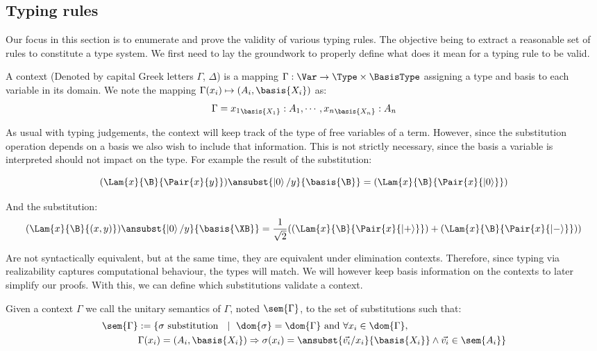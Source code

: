 \subsection{Typing rules}    
Our focus in this section is to enumerate and prove the validity of various typing rules. The objective being to extract a reasonable set of rules to constitute a type system. We first need to lay the groundwork to properly define what does it mean for a typing rule to be valid.

\begin{definition}
    A context (Denoted by capital Greek letters $\Gamma$, $\Delta$) is a mapping $\Gamma:\Var\to\Type\times\BasisType$ assigning a type and basis to each variable in its domain. We note the mapping $\Gamma(x_i)\mapsto(A_i, \basis{X_i})$ as:
    \[
    \Gamma = {x_1}_{\basis{X_1}}:A_1,\dotsb, {x_n}_{\basis{X_n}}:A_n
    \]
\end{definition}

As usual with typing judgements, the context will keep track of the type of free variables of a term. However, since the substitution operation depends on a basis we also wish to include that information. This is not strictly necessary, since the basis a variable is interpreted should not impact on the type. For example the result of the substitution:

\[
(\Lam{x}{\B}{\Pair{x}{y}})\ansubst{\ket{0}/y}{\basis{\B}} = (\Lam{x}{\B}{\Pair{x}{\ket{0}}})
\]

And the substitution:
\[
(\Lam{x}{\B}{(x, y)})\ansubst{\ket{0}/y}{\basis{\XB}} = \frac{1}{\sqrt{2}} ((\Lam{x}{\B}{\Pair{x}{\ket{+}}}) + (\Lam{x}{\B}{\Pair{x}{\ket{-}}}))
\]

Are not syntactically equivalent, but at the same time, they are equivalent under elimination contexts. Therefore, since typing via realizability captures computational behaviour, the types will match. We will however keep basis information on the contexts to later simplify our proofs. With this, we can define which substitutions validate a context.

\begin{definition}
    Given a context $\Gamma$ we call the unitary semantics of $\Gamma$, noted $\sem{\Gamma}$, to the set of substitutions such that:
    \begin{align*}
      \sem{\Gamma} &:= 
      \{\sigma\text{ substitution }~\mid~ \dom{\sigma} = \dom{\Gamma}\text{ and } \forall {x_i} \in\dom{\Gamma},\\
      &\Gamma(x_i) = (A_i, \basis{X_i})\Rightarrow \sigma(x_i)=\ansubst{\vec{v_i}/x_i}{\basis{X_i}} \land \vec{v_i}\in\sem{A_i}\}
    \end{align*}
\end{definition}

